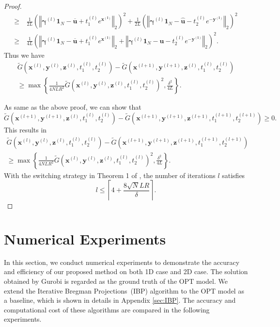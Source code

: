 \documentclass[review,hidelinks,onefignum,onetabnum]{siamart220329}
\begin{document}
\begin{proof}
\begin{equation*}
\begin{aligned}
        \geq & \ \frac{1}{2 L} \left( \left\Vert \bm{\gamma}^{(l)}\bm{1}_N-\bm{\overline{u}}+t_1^{(l)}  e^{\bm{x^{(l)}}} \right\Vert_2 \right)^2
        +\frac{1}{2 L}\left(\left\Vert \bm{\gamma}^{(l)}\bm{1}_N-\bm{\hat{u}}-t_2 ^{(l)}e^{\bm{-y^{(l)}}}\right\Vert_2\right)^2\\
        \geq & \ \frac{1}{4 L}\left(\left\Vert \bm{\gamma}^{(l)}\bm{1}_N-\bm{\overline{u}}+t_1^{(l)}  e^{\bm{x^{(l)}}}\right\Vert_2
        +\left\Vert \bm{\gamma}^{(l)}\bm{1}_N-\bm{\hat{u}}-t_2^{(l)} e^{\bm{-y^{(l)}}}\right\Vert_2\right)^2.
    \end{aligned}
\end{equation*}
Thus we have
\begin{multline*}
    \widetilde{G}\left(\bm{x}^{(l)},\bm{y}^{(l)},\bm{z}^{(l)},t_1^{(l)},t_2^{(l)}\right)-\widetilde{G}\left(\bm{x}^{(l+1)},\bm{y}^{(l+1)},\bm{z}^{(l)},t_1^{(l)},t_2^{(l)}\right)\\
    \geq \max\left\{\frac{1}{4NLR^2}\widetilde{G}(\bm{x}^{(l)},\bm{y}^{(l)},\bm{z}^{(l)},t_1^{(l)},t_2^{(l)})^2, \frac{\delta^2}{4L}\right\}. 
\end{multline*}

As same as the above proof, we can show that 
$$\widetilde{G}\left(\bm{x}^{(l+1)},\bm{y}^{(l+1)},\bm{z}^{(l)},t_1^{(l)},t_2^{(l)}\right)-\widetilde{G}
\left(\bm{x}^{(l+1)},\bm{y}^{(l+1)},\bm{z}^{(l+1)},t_1^{(l+1)},t_2^{(l+1)}\right)\geq 0.$$
This results in
\begin{multline*}
    \widetilde{G}\left(\bm{x}^{(l)},\bm{y}^{(l)},\bm{z}^{(l)},t_1^{(l)},t_2^{(l)}\right)-\widetilde{G}\left(\bm{x}^{(l+1)},\bm{y}^{(l+1)},\bm{z}^{(l+1)},t_1^{(l+1)},t_2^{(l+1)}\right)\\
    \geq \max\left\{\frac{1}{4NLR^2}\widetilde{G}\left(\bm{x}^{(l)},\bm{y}^{(l)},\bm{z}^{(l)},t_1^{(l)},t_2^{(l)}\right)^2, \frac{\delta^2}{4 L}\right\}. 
\end{multline*}
With the switching strategy in Theorem 1 of \cite{dvurechensky2018computational}, the number of iterations $l$ satisfies
$$l\leq \left\lceil 4+\frac{8 \sqrt{N} LR}{\delta} \right\rceil.$$
\quad
\end{proof}


\section{Numerical Experiments}
\label{sec:numerical}
In this section, we conduct numerical experiments to demonstrate the accuracy and efficiency of our proposed method on both 1D case and 2D case. The solution obtained by Gurobi \cite{optimization2021gurobi} is regarded as the ground truth of the OPT model. 
We extend the Iterative Bregman Projections~(IBP) algorithm \cite{IBP} to the OPT model as a baseline, which is shown in details in Appendix \ref{sec:IBP}.
The accuracy and computational cost of these algorithms are compared in the following experiments. 
\end{document}
